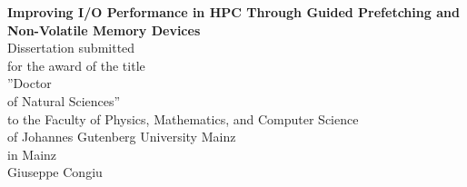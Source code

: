 \documentclass[a4paper,titlepage,oneside,11pt]{book}
\author{Giuseppe Congiu}
\begin{document}
\hypersetup{citecolor=black,filecolor=black,linkcolor=black,urlcolor=blue} %

\begin{titlepage}
\thispagestyle{empty}



\begin{center}
	\vspace{2cm}
    \Large \textbf{Improving I/O Performance in HPC Through Guided Prefetching and Non-Volatile Memory Devices} \\
	\vspace{4cm}
    \normalsize
    Dissertation submitted \\
    for the award of the title \\
    ''Doctor \\
    of Natural Sciences'' \\
    to the Faculty of Physics, Mathematics, and Computer Science \\
    of Johannes Gutenberg University Mainz \\
    in Mainz \\
    \vspace{0.5cm}
    Giuseppe Congiu \\
\end{center}
\vspace{1.7cm}





\end{titlepage}
\end{document}
